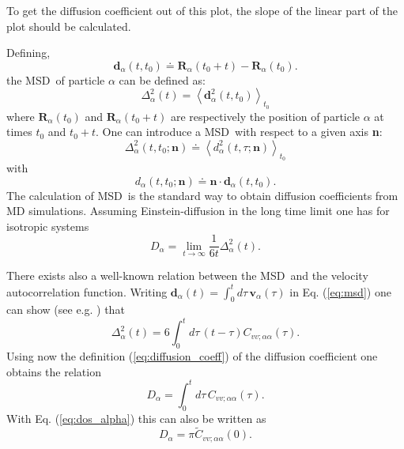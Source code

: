 \documentclass[a4paper,11pt]{article}
\begin{document}
To get the diffusion coefficient out of this plot, the slope of the linear part of the plot should be calculated.

Defining,
\begin{equation}
\textbf{d}_{\alpha}(t,t_0) \doteq \textbf{R}_\alpha(t_0 + t) - \textbf{R}_\alpha(t_0).
\end{equation}
the \gls{MSD}\ of particle $\alpha$ can be defined as:
\begin{equation}
\label{eq:msd}
\Delta^2_\alpha(t) = \left\langle \textbf{d}^2_\alpha(t,t_0) \right\rangle_{t_0}
\end{equation}
where $\textbf{R}_\alpha(t_0)$ and $\textbf{R}_\alpha(t_0 + t)$ are respectively the position of particle $\alpha$ at 
times $t_0$ and $t_0+t$.
One can introduce a \gls{MSD}\ with respect to a given axis \textbf{n}:
\begin{equation}
\label{eq:msd_n}
\Delta^2_\alpha(t,t_0;\textbf{n}) \doteq \left\langle
d^2_\alpha(t,\tau;\textbf{n})\right\rangle_{t_0}
\end{equation}
with
\begin{equation}
d_{\alpha}(t,t_0;\textbf{n}) \doteq \textbf{n}\cdot \textbf{d}_{\alpha}(t,t_0).
\end{equation}
The calculation of \gls{MSD}\ is the standard way
to obtain diffusion coefficients from \gls{MD} simulations. Assuming
Einstein-diffusion in the long time limit one has for isotropic
systems
\begin{equation}
\label{eq:diffusion_coeff}
D_\alpha = \lim_{t\to\infty} \frac{1}{6t} \Delta^2_\alpha(t).
\end{equation}

There exists also a well-known relation between the \gls{MSD}\ and the velocity 
autocorrelation function. Writing $\textbf{d}_\alpha(t) = \int_{0}^{t}d\tau\,\textbf{v}_\alpha(\tau)$  in Eq.
(\ref{eq:msd}) one can show (see e.g. \cite{Yip:1980}) that 
\begin{equation}
\label{eq:msd_vacf}
\Delta^2_\alpha(t) = 6 \int_{0}^{t}d\tau\,(t - \tau)
C_{vv ; \alpha\alpha}(\tau).
\end{equation}
Using now the definition (\ref{eq:diffusion_coeff}) of the diffusion coefficient one
obtains the relation
\begin{equation}
\label{eq:d_vacf}
D_\alpha = \int_{0}^{t}d\tau\, C_{vv ; \alpha\alpha}(\tau).
\end{equation}
With Eq. (\ref{eq:dos_alpha}) this can  also be written as
\begin{equation}
\label{eq:d_dos}
D_\alpha = \pi \tilde C_{vv ; \alpha\alpha}(0).
\end{equation}
\end{document}
